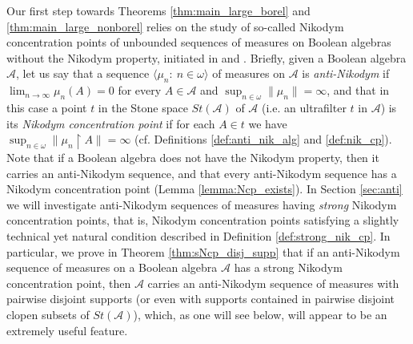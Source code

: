 \documentclass[a4paper,11pt,fleqn]{amsart}
\theoremstyle{definition}
\theoremstyle{remark}
\numberwithin{equation}{section}
\newcommand{\N}{\mathbb{N}}
\newcommand{\aA}{\mathcal{A}}
\newcommand{\rstr}{\restriction}
\newcommand{\seqn}[1]{\big\langle#1\colon\ n\io\big\rangle}
\newcommand{\io}{\in\omega}%
\begin{document}
Our first step towards Theorems \ref{thm:main_large_borel} and \ref{thm:main_large_nonborel} relies on the study of so-called Nikodym concentration points of unbounded sequences of measures on Boolean algebras without the Nikodym property, initiated in \cite{Aiz92} and \cite{Sob19}. Briefly, given a Boolean algebra $\aA$, let us say that a sequence $\seqn{\mu_n}$ of measures on $\aA$ is \textit{anti-Nikodym} if $\lim_{n\to\infty}\mu_n(A)=0$ for every $A\in\aA$ and $\sup_{n\io}\big\|\mu_n\big\|=\infty$, and that in this case a point $t$ in the Stone space $St(\aA)$ of $\aA$ (i.e. an ultrafilter $t$ in $\aA$) is its \textit{Nikodym concentration point} if for each $A\in t$ we have $\sup_{n\io}\big\|\mu_n\rstr A\big\|=\infty$ (cf. Definitions \ref{def:anti_nik_alg} and \ref{def:nik_cp}). Note that if a Boolean algebra does not have the Nikodym property, then it carries an anti-Nikodym sequence, and that every anti-Nikodym sequence has a Nikodym concentration point (Lemma \ref{lemma:Ncp_exists}). %
In Section \ref{sec:anti} we will investigate anti-Nikodym sequences of measures having \textit{strong} Nikodym concentration points, that is, Nikodym concentration points satisfying a slightly technical yet natural condition described in Definition \ref{def:strong_nik_cp}. In particular, %
we prove in Theorem \ref{thm:sNcp_disj_supp} that if an anti-Nikodym sequence of measures on a Boolean algebra $\aA$ has a strong Nikodym concentration point, then $\aA$ carries an anti-Nikodym sequence of measures with pairwise disjoint supports (or even with supports contained in pairwise disjoint clopen subsets of $St(\aA)$), which, as one will see below, will appear to be an extremely useful feature.
\end{document}
